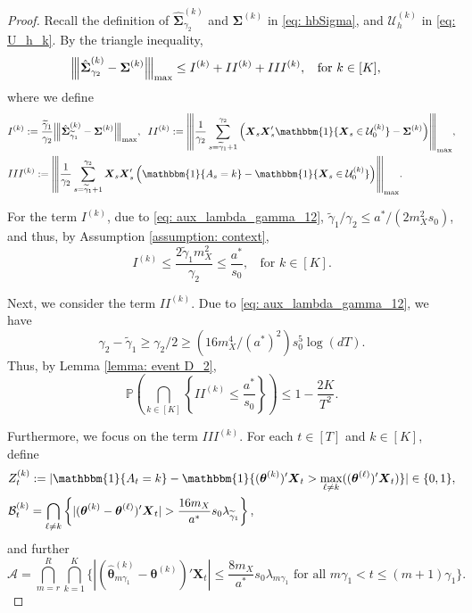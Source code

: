 \documentclass[aos,preprint]{imsart}
\theoremstyle{plain}
\theoremstyle{definition}
\newcommand{\btheta}{\boldsymbol{\theta}}
\newcommand{\hbtheta}{\widehat{\boldsymbol{\theta}}}
\newcommand{\idf}{\mathbbm{1}}
\newcommand{\bX}{\boldsymbol{X}}
\newcommand{\bSigma}{\boldsymbol{\Sigma}}
\newcommand{\op}[1]{{\left\vert\kern-0.25ex\left\vert\kern-0.25ex\left\vert #1\right\vert\kern-0.25ex\right\vert\kern-0.25ex\right\vert}}
\newcommand{\tgamma}{\widetilde{\gamma}}
\newcommand{\hbSigma}{\hat{\boldsymbol{\Sigma}}}
\newcommand{\Pro}{\mathbb{P}}
\begin{document}
\begin{appendix}
\begin{proof}
\medskip




Recall the definition of $\hbSigma_{\gamma_2}^{(k)}$ and $\bSigma^{(k)}$ in \eqref{eq: hbSigma}, and $\mathcal{U}_h^{(k)}$ in \eqref{eq: U_h_k}. By the triangle inequality,
\begin{align}\label{aux:based_case_strategy}
    \op{\hbSigma_{\gamma_2}^{(k)}-\bSigma^{(k)}}_{\textup{max}}&\le  I^{(k)} + II^{(k)} + III^{(k)},\;\; \text{ for } k \in [K],
\end{align}
where we define
\begin{align*}
&I^{(k)} := \frac{\tgamma_1}{\gamma_2} \op{\hbSigma_{\tgamma_1}^{(k)} -\bSigma^{(k)} }_{\textup{max}},\;\;
    II^{(k)} :=\op{\frac{1}{\gamma_2}\sum_{s=\tgamma_1+1}^{\gamma_2} \left(\bX_s\bX_s'\idf\{\bX_s \in\mathcal{U}_0^{(k)}\}-\bSigma^{(k)}\right)}_{\textup{max}},\\
    &III^{(k)} := \op{\frac{1}{\gamma_2}\sum_{s=\tgamma_1+1}^{\gamma_2}\bX_s\bX_s'\left(\idf\{A_s=k\}-\idf\{\bX_s \in \mathcal{U}_0^{(k)}\}\right)}_{\textup{max}}.
\end{align*}

For the term $I^{(k)}$, due to \eqref{eq: aux_lambda_gamma_12}, 
$\tgamma_1/\gamma_2 \leq a^*/(2m_X^2s_0)$, and thus,
by Assumption \ref{assumption: context},  
\begin{equation}\label{eq: gamma2_aux1}
I^{(k)} 
\le \frac{2\tgamma_1 m_X^2}{\gamma_2} \le \frac{a^*}{s_0},\;\; \text{ for } k \in [K].
\end{equation}

Next, we consider the term $II^{(k)}$. Due to \eqref{eq: aux_lambda_gamma_12}, we have $$
\gamma_2 - \tgamma_1 \geq \gamma_2/2 \geq (16m_X^4/(a^*)^2) s_0^5 \log(dT).
$$ 
Thus,  by  Lemma \ref{lemma: event D_2},
\begin{equation}\label{eq: gamma2_aux2}
   \Pro\left( \bigcap_{k \in [K]} \left\{ II^{(k)}  \le \frac{a^*}{s_0}\right\} \right) \leq 1 -\frac{2K}{T^2}.
\end{equation}

Furthermore, we focus on the term $III^{(k)}$. For each $t \in [T]$ and  $k\in[K]$, define
\begin{align*}
    &Z_t^{(k)}:=|\idf\{A_t=k\}-\idf\{(\btheta^{(k)})'\bX_t>\max_{\ell \neq k}((\btheta^{(\ell)})'\bX_t)\}|\in \{0,1\}, \\
        & \mathcal{B}_t^{(k)} = \bigcap_{\ell \neq k}\left\{|(\btheta^{(k)}-\btheta^{(\ell)})'\bX_t| > \frac{16m_X}{a^*} s_0\lambda_{\tgamma_1}\right\},
\end{align*}
and further
\begin{equation*}%
    \mathcal{A} = \bigcap_{m=r}^{R}\bigcap_{k = 1}^{K}\biggl\{|(\hbtheta_{m\gamma_1}^{(k)}-\btheta^{(k)})'\bX_t|\le \frac{8m_X}{a^*}s_0\lambda_{m\gamma_1} \text{ for all } m\gamma_1< t \le (m+1)\gamma_1 \biggr\}.
\end{equation*}


\end{proof}
\end{appendix}
\end{document}

